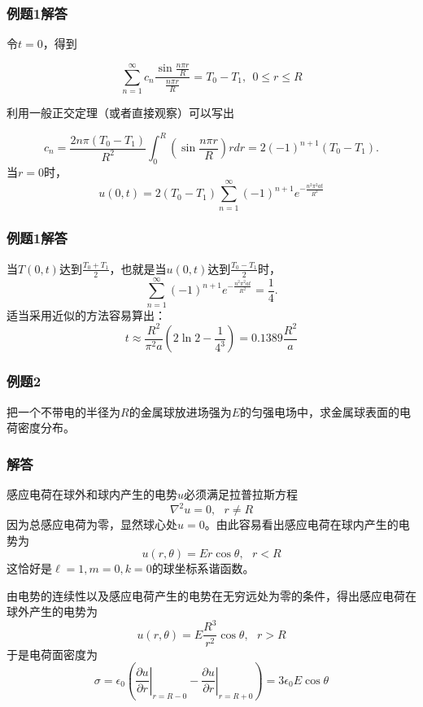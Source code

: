 \documentclass[CJK]{beamer}
\begin{document}
\begin{frame}
\frametitle{例题1解答}

令$t=0$，得到

$$ \sum_{n=1}^\infty c_n\frac{\sin \frac{n\pi r}{R}}{\frac{n\pi r}{R}} = T_0-T_1,\ \   0\le r\le R$$

利用一般正交定理（或者直接观察）可以写出

$$ c_n =  \frac{2n\pi(T_0-T_1)}{R^2}\int_0^R  \left(\sin \frac{n\pi r}{R}\right) r dr = 2(-1)^{n+1}(T_0-T_1) . $$
当$r=0$时，
$$ u(0,t) = 2(T_0-T_1)\sum_{n=1}^\infty (-1)^{n+1} e^{-\frac{n^2\pi^2 at}{R^2}} $$

\end{frame}


\begin{frame}
\frametitle{例题1解答}

当$T(0,t)$达到$\frac{T_0+T_1}{2}$，也就是当$u(0,t)$达到$\frac{T_0-T_1}{2}$时，
$$\sum_{n=1}^\infty (-1)^{n+1} e^{-\frac{n^2\pi^2 at}{R^2}} = \frac{1}{4}.$$
适当采用近似的方法容易算出：
$$ t \approx \frac{R^2}{\pi^2a}\left(2\ln 2 - \frac{1}{4^3}\right) = 0.1389 \frac{R^2}{a} $$

\end{frame}



\begin{frame}
\frametitle{例题2}



把一个不带电的半径为$R$的金属球放进场强为$E$的匀强电场中，求金属球表面的电荷密度分布。

\end{frame}


\begin{frame}
\frametitle{解答}


感应电荷在球外和球内产生的电势$u$必须满足拉普拉斯方程
$$\nabla^2 u = 0,\ \ \ r\ne R$$
因为总感应电荷为零，显然球心处$u=0$。由此容易看出感应电荷在球内产生的电势为
$$ u(r, \theta) = E r \cos\theta,\ \ \ r<R $$
这恰好是$\ell =1, m = 0, k=0$的球坐标系谐函数。

由电势的连续性以及感应电荷产生的电势在无穷远处为零的条件，得出感应电荷在球外产生的电势为
$$ u(r, \theta) = E \frac{R^3}{r^2}\cos\theta, \ \ \ r>R $$
于是电荷面密度为
$$\sigma =  \epsilon_0\left(\left.\frac{\partial u}{\partial r}\right\vert_{r=R-0}-\left.\frac{\partial u}{\partial r}\right\vert_{r=R+0}\right) = 3\epsilon_0E\cos\theta $$ 

\end{frame}
\end{document}
